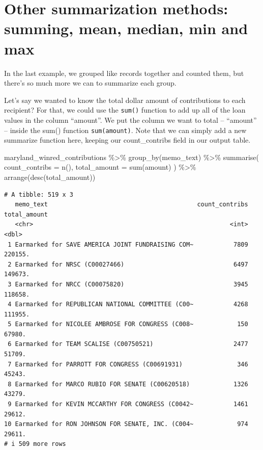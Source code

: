\documentclass[
  letterpaper,
  DIV=11,
  numbers=noendperiod]{scrreprt}
\newenvironment{Shaded}{\begin{snugshade}}{\end{snugshade}}
\newcommand{\AttributeTok}[1]{\textcolor[rgb]{0.40,0.45,0.13}{#1}}
\newcommand{\FunctionTok}[1]{\textcolor[rgb]{0.28,0.35,0.67}{#1}}
\newcommand{\NormalTok}[1]{\textcolor[rgb]{0.00,0.23,0.31}{#1}}
\newcommand{\SpecialCharTok}[1]{\textcolor[rgb]{0.37,0.37,0.37}{#1}}
\begin{document}
\hypertarget{other-summarization-methods-summing-mean-median-min-and-max}{%
\section{Other summarization methods: summing, mean, median, min and
max}\label{other-summarization-methods-summing-mean-median-min-and-max}}

In the last example, we grouped like records together and counted them,
but there's so much more we can to summarize each group.

Let's say we wanted to know the total dollar amount of contributions to
each recipient? For that, we could use the \texttt{sum()} function to
add up all of the loan values in the column ``amount''. We put the
column we want to total -- ``amount'' -- inside the sum() function
\texttt{sum(amount)}. Note that we can simply add a new summarize
function here, keeping our count\_contribs field in our output table.

\begin{Shaded}
\begin{Highlighting}[]
\NormalTok{maryland\_winred\_contributions }\SpecialCharTok{\%\textgreater{}\%}
  \FunctionTok{group\_by}\NormalTok{(memo\_text) }\SpecialCharTok{\%\textgreater{}\%}
  \FunctionTok{summarise}\NormalTok{(}
    \AttributeTok{count\_contribs =} \FunctionTok{n}\NormalTok{(),}
    \AttributeTok{total\_amount =} \FunctionTok{sum}\NormalTok{(amount)}
\NormalTok{  ) }\SpecialCharTok{\%\textgreater{}\%}
  \FunctionTok{arrange}\NormalTok{(}\FunctionTok{desc}\NormalTok{(total\_amount))}
\end{Highlighting}
\end{Shaded}

\begin{verbatim}
# A tibble: 519 x 3
   memo_text                                         count_contribs total_amount
   <chr>                                                      <int>        <dbl>
 1 Earmarked for SAVE AMERICA JOINT FUNDRAISING COM~           7809      220155.
 2 Earmarked for NRSC (C00027466)                              6497      149673.
 3 Earmarked for NRCC (C00075820)                              3945      118658.
 4 Earmarked for REPUBLICAN NATIONAL COMMITTEE (C00~           4268      111955.
 5 Earmarked for NICOLEE AMBROSE FOR CONGRESS (C008~            150       67980.
 6 Earmarked for TEAM SCALISE (C00750521)                      2477       51709.
 7 Earmarked for PARROTT FOR CONGRESS (C00691931)               346       45243.
 8 Earmarked for MARCO RUBIO FOR SENATE (C00620518)            1326       43279.
 9 Earmarked for KEVIN MCCARTHY FOR CONGRESS (C0042~           1461       29612.
10 Earmarked for RON JOHNSON FOR SENATE, INC. (C004~            974       29611.
# i 509 more rows
\end{verbatim}
\end{document}
